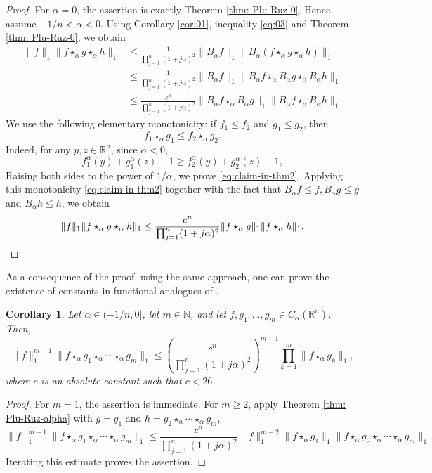 \documentclass[11pt]{amsart}
\newcommand{\R}{{\mathbb R}}
\theoremstyle{plain}
\newtheorem{corollary}[theorem]{Corollary}
\theoremstyle{definition}
\theoremstyle{remark}
\begin{document}
\plunruzalpha*

\begin{proof}
For $\alpha=0$, the assertion is exactly Theorem \ref{thm: Plu-Ruz-0}. Hence, assume $-1 / n<\alpha<0$.
Using Corollary \ref{cor:01}, inequality \eqref{eq:03}
and Theorem \ref{thm: Plu-Ruz-0}, we obtain
\begin{align*}
\|f\|_1\|f\star_\alpha g\star_\alpha h\|_1
&\leq \frac{1}{\prod_{j=1}^n(1+j \alpha)^2}\|B_\alpha f \|_1\|B_\alpha(f\star_\alpha g\star_\alpha h)\|_1\\
&\leq \frac{1}{\prod_{j=1}^n(1+j \alpha)^2}\|B_\alpha f\|_1\|B_\alpha f \star_\alpha B_\alpha g \star_\alpha B_\alpha h\|_1\\
&\leq \frac{c^n}{\prod_{j=1}^n(1+j \alpha)^2}\|B_\alpha f\star_\alpha B_\alpha g\|_1\|B_\alpha f \star_\alpha B_\alpha h\|_1
\end{align*}
We use the following elementary monotonicity: if $f_1 \leq f_2$ and $g_1 \leq g_2$, then
\begin{equation} \label{eq:claim-in-thm2}
    f_1 \star_\alpha g_1 \leq f_2 \star_\alpha g_2 .
\end{equation}
Indeed, for any $y,z \in \R^n$, since $\alpha <0$,
\[
    f_1^\alpha (y) + g_1^\alpha (z) -1 \geq f_2^\alpha (y) + g_2^\alpha (z) -1,
\]
Raising both sides to the power of $1/\alpha$, we prove \eqref{eq:claim-in-thm2}. Applying this monotonicity \eqref{eq:claim-in-thm2} together with the fact that $B_\alpha f \leq f, B_\alpha g \leq g$ and $B_\alpha h \leq h$, we obtain
\[
    \|f\|_1\|f\star_\alpha g\star_\alpha h\|_1
    \leq \frac{c^{n}}{\prod_{j=1}^n(1+j \alpha)^{2}}\| f\star_\alpha  g\|_1\|f \star_\alpha  h\|_1. \qedhere
\]
\end{proof}

As a consequence of the proof, using the same approach, one can prove the existence of constants in functional analogues of \cite[Theorem~4.1]{N-25}.
\begin{corollary}
    Let $\alpha \in (-1/n,0]$, let $m \in \mathbb{N}$, and let $f,g_1,\ldots, g_m \in C_\alpha (\R^n) $. Then,
    \begin{equation}
        \|f\|_1^{m-1} \| f \star_\alpha g_1 \star_\alpha \cdots \star_\alpha g_m \|_1 \leq \left( \frac{c^{n}}{\prod_{j=1}^n(1+j \alpha)^{2}} \right)^{m-1} \prod_{k=1}^m \|f \star_\alpha g_k\|_1,
    \end{equation}
    where $c$ is an absolute constant such that $c <26$.
\end{corollary}

\begin{proof}
    For $m=1$, the assertion is immediate. For $m \geq 2$, apply Theorem \ref{thm: Plu-Ruz-alpha} with $g=g_1$ and $h=g_2 \star_\alpha \cdots \star_\alpha g_m$,
    \[
        \|f\|_1^{m-1} \| f \star_\alpha g_1 \star_\alpha \cdots \star_\alpha g_m \|_1
        \leq
        \frac{c^n}{\prod_{j=1}^n(1+j \alpha)^2}
        \|f\|_1^{m-2} \| f \star_\alpha g_1 \|_1 \|f \star_\alpha g_2 \star_\alpha \cdots \star_\alpha g_m \|_1
    \]
    Iterating this estimate proves the assertion.
\end{proof}
\end{document}
